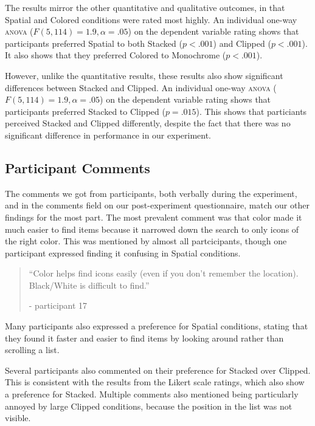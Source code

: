 \documentclass[nobib]{tufte-book} %
\begin{document}
The results mirror the other quantitative and qualitative outcomes, in that Spatial and Colored conditions were rated most highly. An individual one-way \textsc{anova} ($F(5,114) = 1.9, \alpha = .05$) on the dependent variable rating shows that participants preferred Spatial to both Stacked ($p < .001$) and Clipped ($p < .001$). It also shows that they preferred Colored to Monochrome ($p < .001$).

However, unlike the quantitative results, these results also show significant differences between Stacked and Clipped. An individual one-way \textsc{anova} ($F(5,114) = 1.9, \alpha = .05$) on the dependent variable rating shows that participants preferred Stacked to Clipped ($p = .015$). This shows that particiants perceived Stacked and Clipped differently, despite the fact that there was no significant difference in performance in our experiment.


\subsection{Participant Comments}
The comments we got from participants, both verbally during the experiment, and in the comments field on our post-experiment questionnaire, match our other findings for the most part. The most prevalent comment was that color made it much easier to find items because it narrowed down the search to only icons of the right color. This was mentioned by almost all partcicipants, though one participant expressed finding it confusing in Spatial conditions.

\begin{quote}
  ``Color helps find icons easily (even if you don't remember the location). Black/White is difficult to find.''

  - participant 17
\end{quote}

Many participants also expressed a preference for Spatial conditions, stating that they found it faster and easier to find items by looking around rather than scrolling a list.

Several participants also commented on their preference for Stacked over Clipped. This is consistent with the results from the Likert scale ratings, which also show a preference for Stacked.
Multiple comments also mentioned being particularly annoyed by large Clipped conditions, because the position in the list was not visible.
\end{document}
